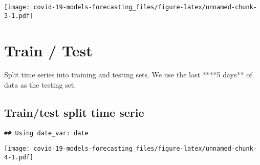 \documentclass[
]{article}
\newenvironment{Shaded}{\begin{snugshade}}{\end{snugshade}}
\newcommand{\DataTypeTok}[1]{\textcolor[rgb]{0.13,0.29,0.53}{#1}}
\newcommand{\KeywordTok}[1]{\textcolor[rgb]{0.13,0.29,0.53}{\textbf{#1}}}
\newcommand{\NormalTok}[1]{#1}
\newcommand{\OperatorTok}[1]{\textcolor[rgb]{0.81,0.36,0.00}{\textbf{#1}}}
\newcommand{\OtherTok}[1]{\textcolor[rgb]{0.56,0.35,0.01}{#1}}
\newcommand{\StringTok}[1]{\textcolor[rgb]{0.31,0.60,0.02}{#1}}
\begin{document}
\begin{Shaded}
\end{Shaded}

\texttt{[image: covid-19-models-forecasting\_files/figure-latex/unnamed-chunk-3-1.pdf]}

\hypertarget{train-test}{%
\section{Train / Test}\label{train-test}}

Split time series into training and testing sets. We use the last ****5
days** of data as the testing set.

\hypertarget{traintest-split-time-serie}{%
\subsection{Train/test split time
serie}\label{traintest-split-time-serie}}

\begin{Shaded}
\end{Shaded}

\begin{verbatim}
## Using date_var: date
\end{verbatim}

\begin{Shaded}
\end{Shaded}

\texttt{[image: covid-19-models-forecasting\_files/figure-latex/unnamed-chunk-4-1.pdf]}
\end{document}
